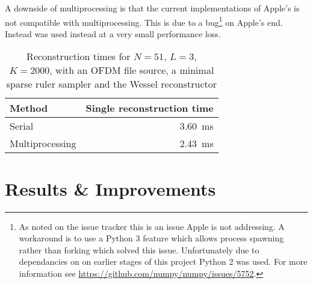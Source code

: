 \documentclass[a4paper, openany, oneside]{memoir}
\begin{document}
A downside of multiprocessing is that the current implementations of Apple's  is not compatible with multiprocessing. This is due to a bug\footnote{As noted on the  issue tracker this is an issue Apple is not addressing. A workaround is to use a Python 3 feature which allows process spawning rather than forking which solved this issue. Unfortunately due to dependancies on  on earlier stages of this project Python 2 was used. For more information see \url{https://github.com/numpy/numpy/issues/5752}.} on Apple's end. Instead  was used instead at a very small performance loss.

\begin{table}
    \centering
    \caption{Reconstruction times for $N = 51$, $L=3$, $K=2000$, with an OFDM file source, a minimal sparse ruler sampler and the Wessel reconstructor}
    \label{tab:mp}
    \begin{tabular}{lr}
        \toprule
        Method          & Single reconstruction time\\
        \midrule
        Serial          & \SI{3.60}{\milli\second}\\
        Multiprocessing & \SI{2.43}{\milli\second}\\
        \bottomrule
    \end{tabular}
\end{table}

\section{Results \& Improvements}
\label{sec:results}

\end{document}
